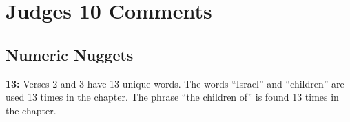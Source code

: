 \section{Judges 10 Comments}

\subsection{Numeric Nuggets}
\textbf{13: } Verses 2 and 3 have 13 unique words. The words ``Israel'' and ``children'' are used 13 times in the chapter. The phrase ``the children of'' is found 13 times in the chapter.



